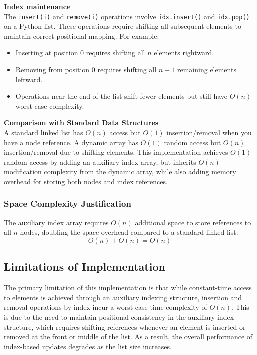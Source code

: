 \documentclass[12pt]{article}
\begin{document}
\noindent\textbf{Index maintenance}\\
The \texttt{insert(i)} and \texttt{remove(i)} operations involve \texttt{idx.insert()} and \texttt{idx.pop()} on a Python list. These operations require shifting all subsequent elements to maintain correct positional mapping. For example:
\begin{itemize}
    \item Inserting at position 0 requires shifting all $n$ elements rightward.
    \item Removing from position 0 requires shifting all $n-1$ remaining elements leftward.
    \item Operations near the end of the list shift fewer elements but still have $O(n)$ worst-case complexity.
\end{itemize}

\noindent\textbf{Comparison with Standard Data Structures}\\
A standard linked list has $O(n)$ access but $O(1)$ insertion/removal when you have a node reference. A dynamic array has $O(1)$ random access but $O(n)$ insertion/removal due to shifting elements. This implementation achieves $O(1)$ random access by adding an auxiliary index array, but inherits $O(n)$ modification complexity from the dynamic array, while also adding memory overhead for storing both nodes and index references.

\subsubsection{Space Complexity Justification}
The auxiliary index array requires $O(n)$ additional space to store references to all $n$ nodes, doubling the space overhead compared to a standard linked list:
\[
O(n) + O(n) = O(n)
\]

\subsection{Limitations of Implementation}

The primary limitation of this implementation is that while constant-time access to elements is achieved through an auxiliary indexing structure, insertion and removal operations by index incur a worst-case time complexity of $O(n)$. This is due to the need to maintain positional consistency in the auxiliary index structure, which requires shifting references whenever an element is inserted or removed at the front or middle of the list. As a result, the overall performance of index-based updates degrades as the list size increases.\\
\end{document}
